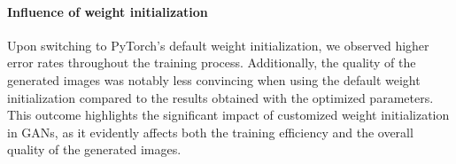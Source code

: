 \paragraph*{Influence of weight initialization}
Upon switching to PyTorch's default weight initialization, we observed higher error rates throughout the training process. Additionally, the quality of the generated images was notably less convincing when using the default weight initialization compared to the results obtained with the optimized parameters. This outcome highlights the significant impact of customized weight initialization in GANs, as it evidently affects both the training efficiency and the overall quality of the generated images.

\begin{figure}[H]
    \centering


\end{figure}
